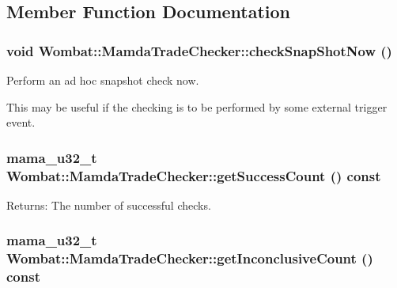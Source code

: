 \subsection{Member Function Documentation}
\hypertarget{classWombat_1_1MamdaTradeChecker_8cd6151eec6a3ddba8b3dc45406bfbd2}{
\subsubsection[checkSnapShotNow]{\setlength{\rightskip}{0pt plus 5cm}void Wombat::Mamda\-Trade\-Checker::check\-Snap\-Shot\-Now ()}}
\label{classWombat_1_1MamdaTradeChecker_8cd6151eec6a3ddba8b3dc45406bfbd2}


Perform an ad hoc snapshot check now. 

This may be useful if the checking is to be performed by some external trigger event. \hypertarget{classWombat_1_1MamdaTradeChecker_6c6dde0cd55dd602c984c5a1759c51e7}{
\subsubsection[getSuccessCount]{\setlength{\rightskip}{0pt plus 5cm}mama\_\-u32\_\-t Wombat::Mamda\-Trade\-Checker::get\-Success\-Count () const}}
\label{classWombat_1_1MamdaTradeChecker_6c6dde0cd55dd602c984c5a1759c51e7}


\begin{Desc}
\item[Returns:]The number of successful checks. \end{Desc}
\hypertarget{classWombat_1_1MamdaTradeChecker_d940914dca854c639cac67bb8ca45049}{
\subsubsection[getInconclusiveCount]{\setlength{\rightskip}{0pt plus 5cm}mama\_\-u32\_\-t Wombat::Mamda\-Trade\-Checker::get\-Inconclusive\-Count () const}}
\label{classWombat_1_1MamdaTradeChecker_d940914dca854c639cac67bb8ca45049}


